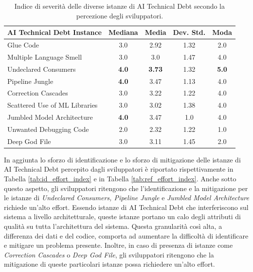 \begin{table}[h]
    \footnotesize
    \centering
    \begin{tabular}{|l|c|c|c|c|}
    \hline
    \textbf{AI Technical Debt Instance} & \textbf{Mediana} & \textbf{Media} & \textbf{Dev. Std.} & \textbf{Moda} \\
    \hline
    Glue Code & 3.0 & 2.92 & 1.32 & 2.0 \\
    Multiple Language Smell & 3.0 & 3.0 & 1.47 & 4.0 \\
    Undeclared Consumers & \textbf{4.0} & \textbf{3.73} & 1.32 & \textbf{5.0} \\
    Pipeline Jungle & \textbf{4.0} & 3.47 & 1.13 & 4.0 \\
    Correction Cascades & 3.0 & 3.22 & 1.22 & 4.0 \\
    Scattered Use of ML Libraries & 3.0 & 3.02 & 1.38 & 4.0 \\
    Jumbled Model Architecture & \textbf{4.0} & 3.47 & 1.0 & 4.0 \\
    Unwanted Debugging Code & 2.0 & 2.32 & 1.22 & 1.0 \\
    Deep God File & 3.0 & 3.11 & 1.45 & 2.0 \\
    \hline
    \end{tabular}
    \caption{Indice di severità delle diverse istanze di AI Technical Debt secondo la percezione degli sviluppatori.}
    \label{tab:sev_index}
\end{table}

In aggiunta lo sforzo di identificazione e lo sforzo di mitigazione delle istanze di AI Technical Debt percepito dagli sviluppatori è riportato rispettivamente in Tabella \ref{tab:id_effort_index} e in Tabella \ref{tab:ref_effort_index}.
Anche sotto questo aspetto, gli sviluppatori ritengono che l'identificazione e la mitigazione per le istanze di \textit{Undeclared Consumers, Pipeline Jungle} e \textit{Jumbled Model Architecture} richiede un'alto effort.
Essendo istanze di AI Technical Debt che interferiscono sul sistema a livello architetturale, queste istanze portano un calo degli attributi di qualità su tutta l'architettura del sistema. Questa granularità così alta, a differenza dei dati e del codice, comporta ad aumentare la difficoltà di identificare e mitigare un problema presente.
Inoltre, in caso di presenza di istanze come \textit{Correction Cascades} o \textit{Deep God File}, gli sviluppatori ritengono che la mitigazione di queste particolari istanze possa richiedere un'alto effort.

